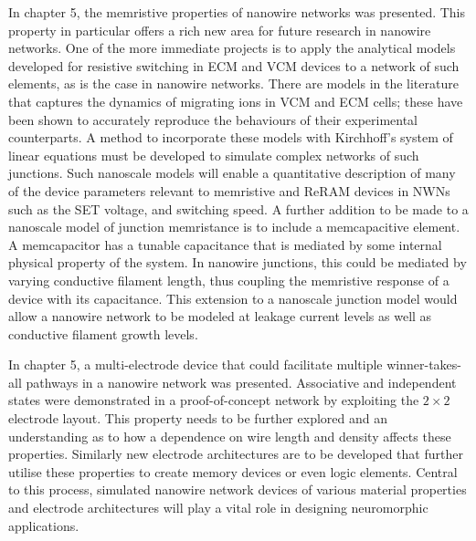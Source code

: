 In chapter 5, the memristive properties of nanowire networks was presented. This property in particular offers a rich new area for future research in nanowire networks. One of the more immediate projects is to apply the analytical models developed for resistive switching in ECM and VCM devices to a network of such elements, as is the case in nanowire networks. There are models in the literature that captures the dynamics of migrating ions in VCM and ECM cells; these have been shown to accurately reproduce the behaviours of their experimental counterparts\cite{hansen2015,menzel2015,menzel2017}. A method to incorporate these models with Kirchhoff's system of linear equations must be developed to simulate complex networks of such junctions. Such nanoscale models will enable a quantitative description of many of the device parameters relevant to memristive and ReRAM devices in NWNs such as the SET voltage, and switching speed. A further addition to be made to a nanoscale model of junction memristance is to include a memcapacitive element\cite{wakrim2016}. A memcapacitor has a tunable capacitance that is mediated by some internal physical property of the system. In nanowire junctions, this could be mediated by varying conductive filament length, thus coupling the memristive response of a device with its capacitance. This extension to a nanoscale junction model would allow a nanowire network to be modeled at leakage current levels as well as conductive filament growth levels.

In chapter 5, a multi-electrode device that could facilitate multiple winner-takes-all pathways in a nanowire network was presented. Associative and independent states were demonstrated in a proof-of-concept network by exploiting the $2 \times 2$ electrode layout. This property needs to be further explored and an understanding as to how a dependence on wire length and density affects these properties. Similarly new electrode architectures are to be developed that further utilise these properties to create memory devices or even logic elements. Central to this process, simulated nanowire network devices of various material properties and electrode architectures will play a vital role in designing neuromorphic applications. 

 


